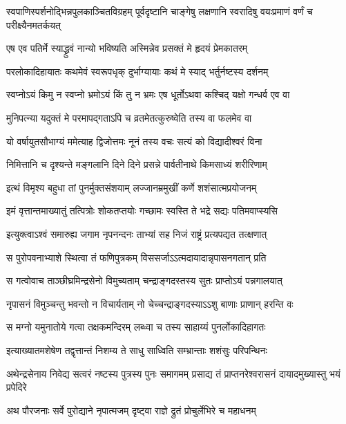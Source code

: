 \begin{center}
\threelineshloka
{स्वपाणिस्पर्शनोद्भिन्नपुलकाञ्चितविग्रहम्}
{पूर्वदृष्टानि चाङ्गेषु लक्षणानि स्वरादिषु}
{वयःप्रमाणं वर्णं च परीक्ष्यैनमतर्कयत्} %

\twolineshloka
{एष एव पतिर्मे स्याद्ध्रुवं नान्यो भविष्यति}
{अस्मिन्नेव प्रसक्तं मे हृदयं प्रेमकातरम्} %

\twolineshloka
{परलोकादिहायातः कथमेवं स्वरूपधृक्}
{दुर्भाग्यायाः कथं मे स्याद् भर्तुर्नष्टस्य दर्शनम्} %

\twolineshloka
{स्वप्नोऽयं किमु न स्वप्नो भ्रमोऽयं किं तु न भ्रमः}
{एष धूर्तोऽथवा कश्चिद् यक्षो गन्धर्व एव वा} %

\twolineshloka
{मुनिपत्न्या यदुक्तं मे परमापद्गताऽपि च}
{व्रतमेतत्कुरुष्वेति तस्य वा फलमेव वा} %

\twolineshloka
{यो वर्षायुतसौभाग्यं ममेत्याह द्विजोत्तमः}
{नूनं तस्य वचः सत्यं को विद्यादीश्वरं विना} %

\twolineshloka
{निमित्तानि च दृश्यन्ते मङ्गलानि दिने दिने}
{प्रसन्ने पार्वतीनाथे किमसाध्यं शरीरिणाम्} %

\twolineshloka
{इत्थं विमृश्य बहुधा तां पुनर्मुक्तसंशयाम्}
{लज्जानम्रमुखीं कर्णे शशंसात्मप्रयोजनम्} %

\twolineshloka
{इमं वृत्तान्तमाख्यातुं तत्पित्रोः शोकतप्तयोः}
{गच्छामः स्वस्ति ते भद्रे सद्यः पतिमवाप्स्यसि} %

\twolineshloka
{इत्युक्त्वाऽश्वं समारुह्य जगाम नृपनन्दनः}
{ताभ्यां सह निजं राष्ट्रं प्रत्यपद्यत तत्क्षणात्} %

\twolineshloka
{स पुरोपवनाभ्याशे स्थित्वा तं फणिपुत्रकम्}
{विससर्जाऽऽत्मदायादान्नृपासनगतान् प्रति} %

\twolineshloka
{स गत्वोवाच ताञ्छीघ्रमिन्द्रसेनो विमुच्यताम्}
{चन्द्राङ्गदस्तस्य सुतः प्राप्तोऽयं पन्नगालयात्} %

\twolineshloka
{नृपासनं विमुञ्चन्तु भवन्तो न विचार्यताम्}
{नो चेच्चन्द्राङ्गदस्याऽऽशु बाणाः प्राणान् हरन्ति वः} %

\twolineshloka
{स मग्नो यमुनातोये गत्वा तक्षकमन्दिरम्}
{लब्ध्वा च तस्य साहाय्यं पुनर्लोकादिहागतः} %

\twolineshloka
{इत्याख्यातमशेषेण तद्वृत्तान्तं निशम्य ते}
{साधु साध्विति सम्भ्रान्ताः शशंसुः परिपन्थिनः} %

\fourlineindentedshloka
{अथेन्द्रसेनाय निवेद्य सत्वरं}
{नष्टस्य पुत्रस्य पुनः समागमम्}
{प्रसाद्य तं प्राप्तनरेश्वरासनं}
{दायादमुख्यास्तु भयं प्रपेदिरे} %

\twolineshloka
{अथ पौरजनाः सर्वे पुरोद्याने नृपात्मजम्}
{दृष्ट्वा राज्ञे द्रुतं प्रोचुर्लेभिरे च महाधनम्} %


\end{center}
